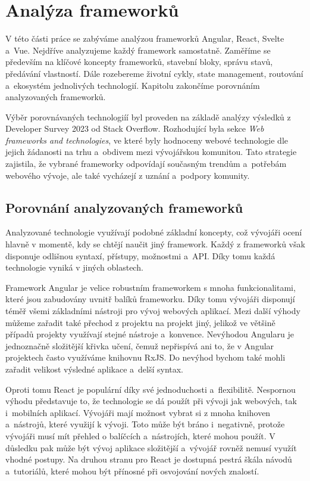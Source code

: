 \section{Analýza frameworků}

V této části práce se zabýváme analýzou frameworků Angular, React, Svelte a~Vue. Nejdříve analyzujeme každý framework samostatně. 
Zaměříme se především na klíčové koncepty frameworků, stavební bloky, správu stavů, předávání vlastností. 
Dále rozebereme životní cykly, state management, routování a~ekosystém jednolivých technologií. 
Kapitolu zakončíme porovnáním analyzovaných frameworků.

Výběr porovnávaných technologiíí byl proveden na základě analýzy výsledků z Developer Survey 2023 od Stack Overflow. 
Rozhodující byla sekce \emph{Web frameworks and technologies}, ve které byly hodnoceny webové technologie dle jejich žádanosti na trhu a~obdivem mezi vývojářskou komunitou. 
Tato strategie zajistila, že vybrané frameworky odpovídají současným trendům a~potřebám webového vývoje, ale také vycházejí z uznání a~podpory komunity.\cite{stackoverflow, developersurvey}







\subsection{Porovnání analyzovaných frameworků}

Analyzované technologie využívají podobné základní koncepty, což vývojáři ocení hlavně v momentě, kdy se chtějí naučit jiný framework. 
Každý z frameworků však disponuje odlišnou syntaxí, přístupy, možnostmi a~API. Díky tomu každá technologie vyniká v jiných oblastech.

Framework Angular je velice robustním frameworkem s mnoha funkcionalitami, které jsou zabudovány uvnitř balíků frameworku. 
Díky tomu vývojáři disponují téměř všemi základními nástroji pro vývoj webových aplikací. 
Mezi další výhody můžeme zařadit také přechod z projektu na projekt jiný, jelikož ve většině případů projekty využívají stejné nástroje a~konvence. 
Nevýhodou Angularu je jednoznačně složitější křivka učení, čemuž nepřispívá ani to, že v Angular projektech často využíváme knihovnu RxJS. 
Do nevýhod bychom také mohli zařadit velikost výsledné aplikace a~delší syntax.

Oproti tomu React je populární díky své jednoduchosti a~flexibilitě. 
Nespornou výhodu představuje to, že technologie se dá použít při vývoji jak webových, tak i~mobilních aplikací. 
Vývojáři mají možnost vybrat si z mnoha knihoven a~nástrojů, které využijí k vývoji. 
Toto může být bráno i~negativně, protože vývojáři musí mít přehled o balíčcích a~nástrojích, které mohou použít. 
V důsledku pak může být vývoj aplikace složitější a~vývojář rovněž nemusí využít vhodné postupy. 
Na druhou stranu pro React je dostupná pestrá škála návodů a~tutoriálů, které mohou být přínosné při osvojování nových znalostí.

